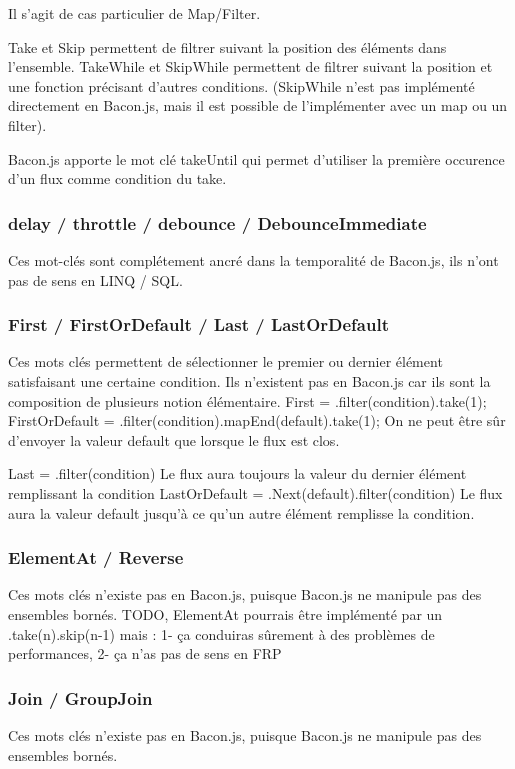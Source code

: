       Il s'agit de cas particulier de Map/Filter.

      Take et Skip permettent de filtrer suivant la position des éléments dans l'ensemble.
      TakeWhile et SkipWhile permettent de filtrer suivant la position et une fonction précisant d'autres conditions.
      (SkipWhile n'est pas implémenté directement en Bacon.js, mais il est possible de l'implémenter avec un map ou un filter).

      Bacon.js apporte le mot clé takeUntil qui permet d'utiliser la première occurence d'un flux comme condition du take.

    \subsubsection{delay / throttle / debounce / DebounceImmediate}
      Ces mot-clés sont complétement ancré dans la temporalité de Bacon.js, ils n'ont pas de sens en LINQ / SQL.

    \subsubsection{First / FirstOrDefault / Last / LastOrDefault}
      Ces mots clés permettent de sélectionner le premier ou dernier élément satisfaisant une certaine condition.
      Ils n'existent pas en Bacon.js car ils sont la composition de plusieurs notion élémentaire.
      First = .filter(condition).take(1);
      FirstOrDefault = .filter(condition).mapEnd(default).take(1);
        On ne peut être sûr d'envoyer la valeur default que lorsque le flux est clos.
      
      Last = .filter(condition)
        Le flux aura toujours la valeur du dernier élément remplissant la condition
      LastOrDefault = .Next(default).filter(condition)
        Le flux aura la valeur default jusqu'à ce qu'un autre élément remplisse la condition.

    \subsubsection{ElementAt / Reverse}
      Ces mots clés n'existe pas en Bacon.js, puisque Bacon.js ne manipule pas des ensembles bornés.
      TODO, ElementAt pourrais être implémenté par un .take(n).skip(n-1) mais : 1- ça conduiras sûrement à des problèmes de performances, 2- ça n'as pas de sens en FRP

    \subsubsection{Join / GroupJoin}
      Ces mots clés n'existe pas en Bacon.js, puisque Bacon.js ne manipule pas des ensembles bornés.

